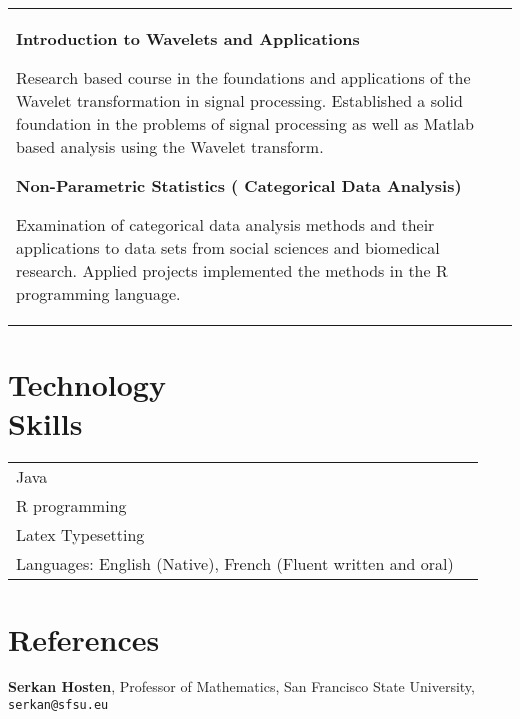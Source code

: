 \documentclass[margin,line,pifont,palatino,courier]{res}
\newenvironment{list1}{
  \begin{list}{\ding{113}}{%
      \setlength{\itemsep}{0in}
      \setlength{\parsep}{0in} \setlength{\parskip}{0in}
      \setlength{\topsep}{0in} \setlength{\partopsep}{0in}
      \setlength{\leftmargin}{0.17in}}}{\end{list}}
\begin{document}
\begin{resume}
\begin{tabular}{@{}p{5in}p{3in}}
\begin{list1}
\item \textbf{Introduction to Wavelets and Applications}

		Research based course in the foundations and applications of the Wavelet transformation in signal processing.  Established a solid foundation in the problems of signal processing as well as Matlab based analysis using the Wavelet transform.  
		
\item \textbf{Non-Parametric Statistics ( Categorical Data Analysis)}  

	Examination of categorical data analysis methods and their applications to data sets from social sciences and biomedical research.   Applied projects implemented the methods in the R programming language.  
	

\end{list1}

\end{tabular}

\section{\sc Technology \\ Skills}

\begin{tabular}{@{}p{6in}p{3in}}

Java\\
R programming\\
Latex Typesetting\\
Languages:  English (Native), French (Fluent written and oral)\\

\end{tabular}




\section{\sc References}

{\bf Serkan Hosten}, Professor of Mathematics, San Francisco State University,
\texttt{serkan@sfsu.eu}




\end{resume}
\end{document}
